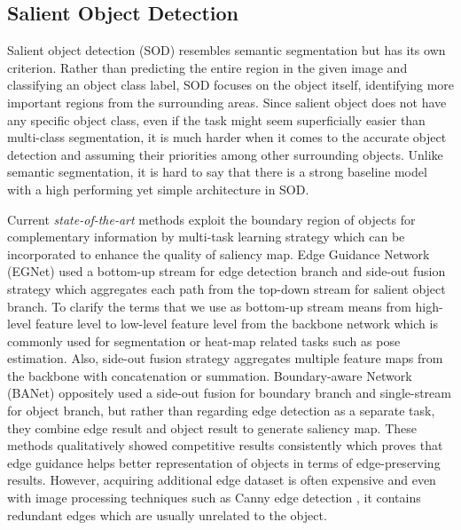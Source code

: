 \documentclass[sigconf]{acmart}
\begin{document}
\subsection{Salient Object Detection}

Salient object detection (SOD) resembles semantic segmentation but has its own criterion. Rather than predicting the entire region in the given image and classifying an object class label, SOD focuses on the object itself, identifying more important regions from the surrounding areas. Since salient object does not have any specific object class, even if the task might seem superficially easier than multi-class segmentation, it is much harder when it comes to the accurate object detection and assuming their priorities among other surrounding objects. Unlike semantic segmentation, it is hard to say that there is a strong baseline model with a high performing yet simple architecture in SOD. 

Current \textit{state-of-the-art} methods exploit the boundary region of objects for complementary information by multi-task learning strategy which can be incorporated to enhance the quality of saliency map. Edge Guidance Network (EGNet) \cite{yang2017edge} used a bottom-up stream for edge detection branch and side-out fusion strategy which aggregates each path from the top-down stream for salient object branch. To clarify the terms that we use as bottom-up stream means from high-level feature level to low-level feature level from the backbone network which is commonly used for segmentation or heat-map related tasks such as pose estimation. Also, side-out fusion strategy aggregates multiple feature maps from the backbone with concatenation or summation. Boundary-aware Network (BANet) \cite{su2019selectivity} oppositely used a side-out fusion for boundary branch and single-stream for object branch, but rather than regarding edge detection as a separate task, they combine edge result and object result to generate saliency map. These methods qualitatively showed competitive results consistently \cite{wang2021salient} which proves that edge guidance helps better representation of objects in terms of edge-preserving results. However, acquiring additional edge dataset is often expensive and even with image processing techniques such as Canny edge detection \cite{4767851}, it contains redundant edges which are usually unrelated to the object. 
\end{document}
